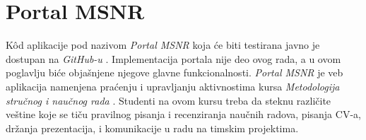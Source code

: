 \documentclass[12pt,oneside]{memoir}
\begin{document}

\chapter{Portal MSNR}
\label{chp:msnr}

\par K\^{o}d aplikacije pod nazivom \emph{Portal MSNR} koja će biti testirana javno je dostupan na \emph{GitHub-u} \cite{msnr-portal}. Implementacija portala nije deo ovog rada, a u ovom poglavlju biće objašnjene njegove glavne funkcionalnosti. \emph{Portal MSNR} je veb aplikacija namenjena praćenju i upravljanju aktivnostima kursa \emph{Metodologija stručnog i naučnog rada} \cite{rad}. Studenti na ovom kursu treba da steknu različite veštine koje se tiču pravilnog pisanja i recenziranja naučnih radova, pisanja CV-a, držanja prezentacija, i komunikacije u radu na timskim projektima. 
\end{document}
